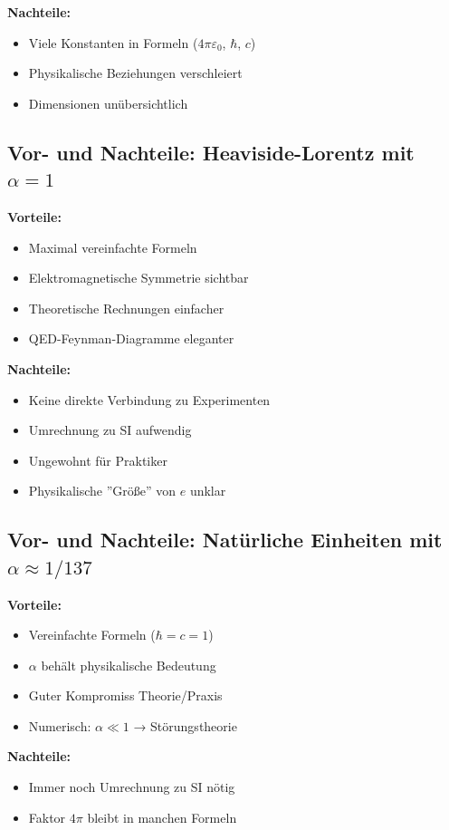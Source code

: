 	\textbf{Nachteile:}
	\begin{itemize}
		\item Viele Konstanten in Formeln ($4\pi\varepsilon_0$, $\hbar$, $c$)
		\item Physikalische Beziehungen verschleiert
		\item Dimensionen unübersichtlich
	\end{itemize}
	
	\subsection{Vor- und Nachteile: Heaviside-Lorentz mit $\alpha = 1$}
	
	\textbf{Vorteile:}
	\begin{itemize}
		\item Maximal vereinfachte Formeln
		\item Elektromagnetische Symmetrie sichtbar
		\item Theoretische Rechnungen einfacher
		\item QED-Feynman-Diagramme eleganter
	\end{itemize}
	
	\textbf{Nachteile:}
	\begin{itemize}
		\item Keine direkte Verbindung zu Experimenten
		\item Umrechnung zu SI aufwendig
		\item Ungewohnt für Praktiker
		\item Physikalische ''Größe'' von $e$ unklar
	\end{itemize}
	
	\subsection{Vor- und Nachteile: Natürliche Einheiten mit $\alpha \approx 1/137$}
	
	\textbf{Vorteile:}
	\begin{itemize}
		\item Vereinfachte Formeln ($\hbar = c = 1$)
		\item $\alpha$ behält physikalische Bedeutung
		\item Guter Kompromiss Theorie/Praxis
		\item Numerisch: $\alpha \ll 1$ → Störungstheorie
	\end{itemize}
	
	\textbf{Nachteile:}
	\begin{itemize}
		\item Immer noch Umrechnung zu SI nötig
		\item Faktor $4\pi$ bleibt in manchen Formeln
	\end{itemize}
	
